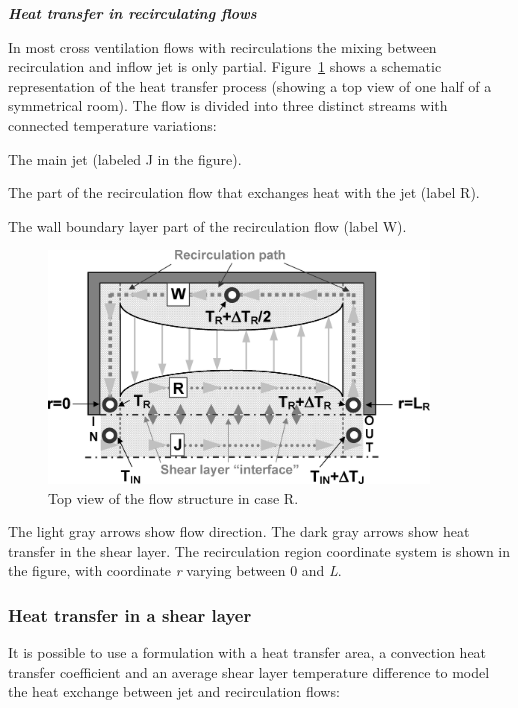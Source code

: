 {\textbf{\emph{Heat transfer in recirculating flows}}

In most cross ventilation flows with recirculations the mixing between recirculation and inflow jet is only partial. Figure~\ref{fig:top-view-of-the-flow-structure-in-case-r.} shows a schematic representation of the heat transfer process (showing a top view of one half of a symmetrical room). The flow is divided into three distinct streams with connected temperature variations:

The main jet (labeled J in the figure).

The part of the recirculation flow that exchanges heat with the jet (label R).

The wall boundary layer part of the recirculation flow (label W).

\begin{figure}[hbtp] %
\centering
\includegraphics[width=0.9\textwidth, height=0.9\textheight, keepaspectratio=true]{media/image2663.png}
\caption{Top view of the flow structure in case R. \protect \label{fig:top-view-of-the-flow-structure-in-case-r.}}
\end{figure}

The light gray arrows show flow direction. The dark gray arrows show heat transfer in the shear layer. The recirculation region coordinate system is shown in the figure, with coordinate \emph{r} varying between 0 and \emph{L}.

\subsubsection{Heat transfer in a shear layer}\label{heat-transfer-in-a-shear-layer}

It is possible to use a formulation with a heat transfer area, a convection heat transfer coefficient and an average shear layer temperature difference to model the heat exchange between jet and recirculation flows:

}
